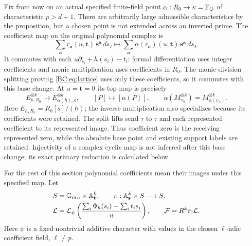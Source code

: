 Fix from now on an actual specified finite-field point
\(\alpha:R_0\to\kappa=\mathbb F_Q\) of characteristic \(p>d+1\).
There are arbitrarily large admissible characteristics by the
proposition, but a chosen point is not extended across an inverted
prime.  The coefficient map on the original polynomial complex is
\[
 \sum_{\mathbf a}r_{\mathbf a}(u,\mathbf t)\,
       \mathbf s^{\mathbf a}\,ds_I
 \longmapsto
 \sum_{\mathbf a}\alpha(r_{\mathbf a})(u,\mathbf t)\,
       \mathbf s^{\mathbf a}\,ds_I .
 \tag{BCF.3}\label{BC:eq:coefficient-chain-map}
\]
It commutes with each \(u\partial_{s_i}+h(s_i)-t_i\):
formal differentiation uses integer coefficients and monic
multiplication uses coefficients in \(R_0\).
The monic-division splitting proving \eqref{BC:eq:lattice}
uses only these coefficients, so it commutes with this base
change.  At \(u=\mathbf t=0\) its top map is precisely
\[
 E_{h,R_0}^{\otimes k}\longrightarrow
 E_{\alpha(h),\kappa}^{\otimes k},\qquad
 [P]\longmapsto[\alpha(P)],\qquad
 \alpha(M_{\upsilon_h}^{\otimes k})
       =M_{\alpha(\upsilon_h)}^{\otimes k}.
 \tag{BCF.4}\label{BC:eq:coefficient-unit-map}
\]
Here \(E_{h,R_0}=R_0[s]/(h)\); the inverse multiplication
also specializes because its coefficients were retained.
The split lifts send \(\tau\) to \(\tau\) and each represented
coefficient to its represented image.  Thus coefficient zero
is the receiving represented zero, while the absolute base point
and existing support labels are retained.  Injectivity of a
complex cyclic map is not inferred after this base change;
its exact primary reduction is calculated below.

For the rest of this section polynomial coefficients mean their images
under this specified map.  Let
\begin{align}
 S&={\mathbb G_m}_u\times\mathbb A^k_{\mathbf t},\qquad
 \pi:\mathbb A^k_{\mathbf s}\times S\longrightarrow S,\nonumber\\
 \mathcal L&=\mathcal L_\psi
       \left(\frac{\sum_i\Phi_h(s_i)-\sum_i t_i s_i}{u}\right),
       \qquad \mathcal F=R^k\pi_!\mathcal L.
 \label{BC:eq:finite-family}
\end{align}
Here $\psi$ is a fixed nontrivial additive character with values in the
chosen $\ell$-adic coefficient field, $\ell\ne p$.

